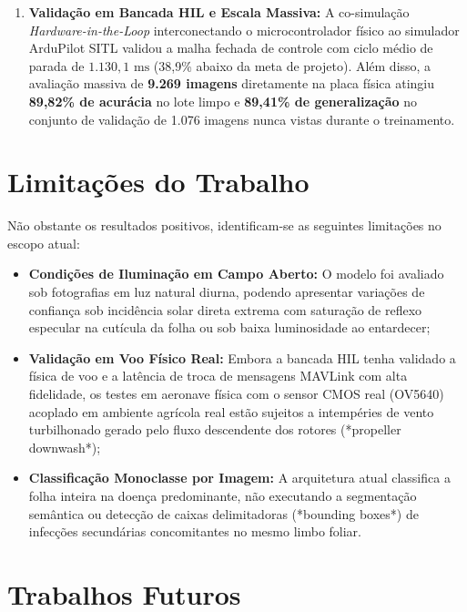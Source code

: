 \begin{enumerate}
    \item \textbf{Validação em Bancada HIL e Escala Massiva:} A co-simulação \textit{Hardware-in-the-Loop} interconectando o microcontrolador físico ao simulador ArduPilot SITL validou a malha fechada de controle com ciclo médio de parada de $1.130,1\text{ ms}$ (38,9\% abaixo da meta de projeto). Além disso, a avaliação massiva de \textbf{9.269 imagens} diretamente na placa física atingiu \textbf{89,82\% de acurácia} no lote limpo e \textbf{89,41\% de generalização} no conjunto de validação de 1.076 imagens nunca vistas durante o treinamento.
\end{enumerate}

\section{Limitações do Trabalho}

Não obstante os resultados positivos, identificam-se as seguintes limitações no escopo atual:
\begin{itemize}
    \item \textbf{Condições de Iluminação em Campo Aberto:} O modelo foi avaliado sob fotografias em luz natural diurna, podendo apresentar variações de confiança sob incidência solar direta extrema com saturação de reflexo especular na cutícula da folha ou sob baixa luminosidade ao entardecer;
    \item \textbf{Validação em Voo Físico Real:} Embora a bancada HIL tenha validado a física de voo e a latência de troca de mensagens MAVLink com alta fidelidade, os testes em aeronave física com o sensor CMOS real (OV5640) acoplado em ambiente agrícola real estão sujeitos a intempéries de vento turbilhonado gerado pelo fluxo descendente dos rotores (*propeller downwash*);
    \item \textbf{Classificação Monoclasse por Imagem:} A arquitetura atual classifica a folha inteira na doença predominante, não executando a segmentação semântica ou detecção de caixas delimitadoras (*bounding boxes*) de infecções secundárias concomitantes no mesmo limbo foliar.
\end{itemize}

\section{Trabalhos Futuros}

